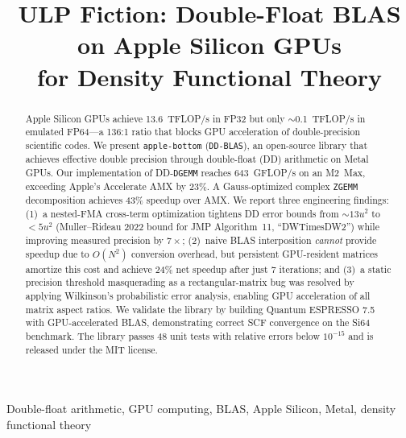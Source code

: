 \documentclass[conference]{IEEEtran}
\newcommand{\DGEMM}{\texttt{DGEMM}}
\newcommand{\ZGEMM}{\texttt{ZGEMM}}
\newcommand{\AB}{\texttt{apple-bottom}}
\begin{document}
\title{ULP Fiction: Double-Float BLAS on Apple Silicon GPUs\\for Density Functional Theory}
\author{
}
\maketitle
\begin{abstract}
Apple Silicon GPUs achieve 13.6~TFLOP/s in FP32 but only ${\sim}$0.1~TFLOP/s in emulated FP64---a 136:1 ratio that blocks GPU acceleration of double-precision scientific codes. We present \AB{} (\texttt{DD-BLAS}), an open-source library that achieves effective double precision through double-float (DD) arithmetic on Metal GPUs. Our implementation of DD-\DGEMM{} reaches 643~GFLOP/s on an M2~Max, exceeding Apple's Accelerate AMX by 23\%. A Gauss-optimized complex \ZGEMM{} decomposition achieves 43\% speedup over AMX. We report three engineering findings: (1)~a nested-FMA cross-term optimization tightens DD error bounds from ${\sim}13u^2$ to $<5u^2$ (Muller--Rideau 2022 bound for JMP Algorithm~11, ``DWTimesDW2'') while improving measured precision by $7{\times}$; (2)~naive BLAS interposition \emph{cannot} provide speedup due to $O(N^2)$ conversion overhead, but persistent GPU-resident matrices amortize this cost and achieve 24\% net speedup after just 7 iterations; and (3)~a static precision threshold masquerading as a rectangular-matrix bug was resolved by applying Wilkinson's probabilistic error analysis, enabling GPU acceleration of all matrix aspect ratios. We validate the library by building Quantum ESPRESSO 7.5 with GPU-accelerated BLAS, demonstrating correct SCF convergence on the Si64 benchmark. The library passes 48 unit tests with relative errors below $10^{-15}$ and is released under the MIT license.
\end{abstract}
\begin{IEEEkeywords}
Double-float arithmetic, GPU computing, BLAS, Apple Silicon, Metal, density functional theory
\end{IEEEkeywords}
\end{document}
